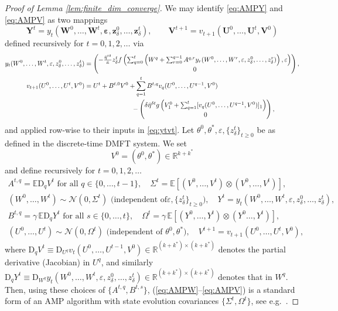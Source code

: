 \documentclass[11pt,letterpaper,reqno]{amsart}
\theoremstyle{definition}
\def\eps{\varepsilon}
\def\D{\mathrm{D}}
\def\E{\mathbb{E}}
\def\R{\mathbb{R}}
\def\cN{\mathcal{N}}
\def\z{\mathbf{z}}
\def\U{\mathbf{U}}
\def\V{\mathbf{V}}
\def\W{\mathbf{W}}
\def\Y{\mathbf{Y}}
\def\beps{\boldsymbol{\varepsilon}}
\begin{document}
\begin{proof}[Proof of Lemma \ref{lem:finite_dim_converge}]
We may identify \eqref{eq:AMPY} and \eqref{eq:AMPV} as two mappings
\begin{equation}\label{eq:ytvt}
\Y^t=y_t(\W^0,\ldots,\W^t,\beps,\z_\delta^0,\ldots,\z_\delta^t),
\qquad \V^{t+1}=v_{t+1}(\U^0,\ldots,\U^t,\V^0)
\end{equation}
defined recursively for $t=0,1,2,\ldots$ via
\begin{align}
y_t(W^0,\ldots,W^t,\eps,z_\delta^0,\ldots,z_\delta^t)
&=\begin{pmatrix} {-}\frac{\bar\eta^{t\delta}}{\bar\kappa}z_\delta^t 
f\left(\sum_{q=0}^t \left(W^q+\sum_{r=0}^{q-1}
A^{q,r}y_r(W^0,\ldots,W^r,\eps,z_\delta^0,\ldots,z_\delta^r)\right),\eps\right)
\\ 0 \end{pmatrix},\label{eq:yt}\\
v_{t+1}(U^0,\ldots,U^t,V^0)
&=U^t+B^{t,0}V^0+\sum_{q=1}^t B^{t,q}v_q(U^0,\ldots,U^{q-1},V^0)\notag\\
&\hspace{1in}-\begin{pmatrix} \delta\bar\eta^{\delta t}g\left(V_1^0+\sum_{q=1}^t
[v_q(U^0,\ldots,U^{q-1},V^0)]_1\right) \\ 0 \end{pmatrix},\label{eq:vt}
\end{align}
and applied row-wise to their inputs in \eqref{eq:ytvt}.
Let $\theta^0,\theta^*,\eps,\{z_\delta^t\}_{t \geq 0}$ be as defined in the
discrete-time DMFT system. We set
\[V^0=(\theta^0,\theta^*) \in \R^{k+k^*}\]
and define recursively for $t=0,1,2,\ldots$
\begin{equation}\label{eq:AMPstateevolution}
\begin{gathered}
A^{t,q}=\E\D_q V^t \text{ for all } q \in \{0,\ldots,t-1\},
\quad \Sigma^t=\E[(V^0,\ldots,V^t) \otimes (V^0,\ldots,V^t)],\\
(W^0,\ldots,W^t) \sim \cN(0,\Sigma^t) \text{ (independent of
$\eps,\{z_\delta^t\}_{t \geq 0}$)}, \quad
Y^t=y_t(W^0,\ldots,W^t,\eps,z_\delta^0,\ldots,z_\delta^t),\\
B^{t,q}=\gamma\,\E\D_q Y^t \text{ for all } s \in \{0,\ldots,t\}, \quad
\Omega^t=\gamma\,\E[(Y^0,\ldots,Y^t) \otimes (Y^0 \ldots,Y^t)],\\
(U^0,\ldots,U^t) \sim \cN(0,\Omega^t) \text{ (independent of $\theta^0,\theta^*$)},
\quad V^{t+1}=v_{t+1}(U^0,\ldots,U^t,V^0),
\end{gathered}
\end{equation}
where $\D_q V^t \equiv \D_{U^q} v_t(U^0,\ldots,U^{t-1},V^0) \in \R^{(k+k^*)
\times (k+k^*)}$ denotes the partial derivative (Jacobian) in $U^q$, and
similarly $\D_q Y^t \equiv \D_{W^q}
y_t(W^0,\ldots,W^t,\eps,z_\delta^0,\ldots,z_\delta^t) \in
\R^{(k+k^*) \times (k+k^*)}$ denotes that in $W^q$. Then, using these choices of
$\{A^{t,q},B^{t,s}\}$, (\ref{eq:AMPW}--\ref{eq:AMPV}) is a standard form of an
AMP algorithm with state evolution covariances $\{\Sigma^t,\Omega^t\}$, see
e.g.\ \cite{javanmard2013state}.


\end{proof}
\end{document}
